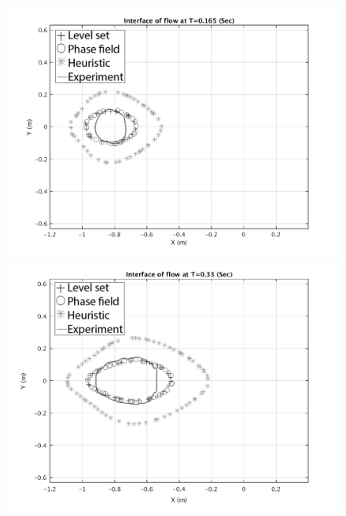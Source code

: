 \documentclass[letterpaper,10pt]{article}
\begin{document}
\begin{figure}[H]
        \begin{minipage}[b]{.5\linewidth}
                \centering                
                \includegraphics[width=1\textwidth]{IMAGES/interface165.png}                
                \includegraphics[width=1\textwidth]{IMAGES/interface330.png}
                \label{y_extent}
        \end{minipage}
        \begin{minipage}[b]{.5 \linewidth}
                \centering

\end{minipage}
\end{figure}
\end{document}

